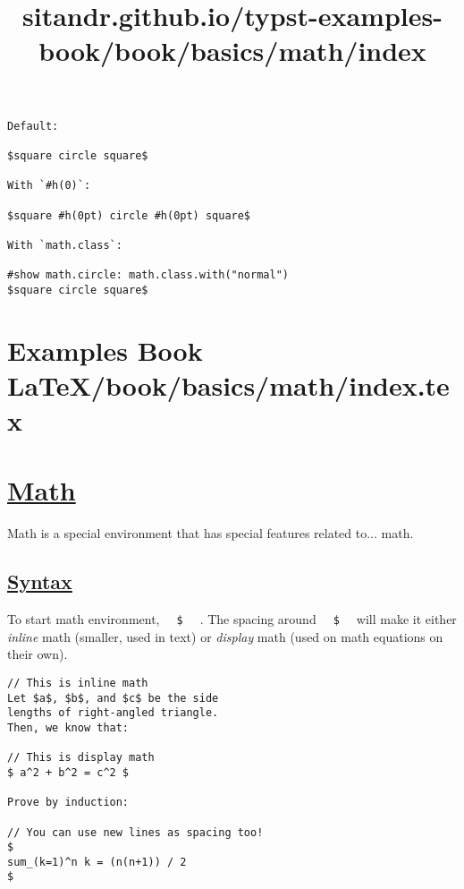 \begin{verbatim}
Default:

$square circle square$

With `#h(0)`:

$square #h(0pt) circle #h(0pt) square$

With `math.class`:

#show math.circle: math.class.with("normal")
$square circle square$
\end{verbatim}

\pandocbounded{}


\section{Examples Book LaTeX/book/basics/math/index.tex}
\title{sitandr.github.io/typst-examples-book/book/basics/math/index}

\section{\texorpdfstring{\hyperref[math]{Math}}{Math}}\label{math}

Math is a special environment that has special features related to...
math.

\subsection{\texorpdfstring{\hyperref[syntax]{Syntax}}{Syntax}}\label{syntax}

To start math environment, \texttt{\ }{\texttt{\ \$\ }}\texttt{\ } . The
spacing around \texttt{\ }{\texttt{\ \$\ }}\texttt{\ } will make it
either \emph{inline} math (smaller, used in text) or \emph{display} math
(used on math equations on their own).

\begin{verbatim}
// This is inline math
Let $a$, $b$, and $c$ be the side
lengths of right-angled triangle.
Then, we know that:

// This is display math
$ a^2 + b^2 = c^2 $

Prove by induction:

// You can use new lines as spacing too!
$
sum_(k=1)^n k = (n(n+1)) / 2
$
\end{verbatim}

\pandocbounded{}

